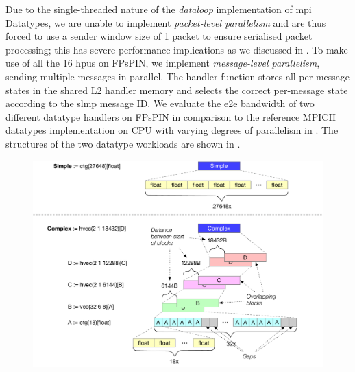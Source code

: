 Due to the single-threaded nature of the \emph{dataloop} implementation of \ac{mpi} Datatypes, we are unable to implement \emph{packet-level parallelism} and are thus forced to use a sender window size of 1 packet to ensure serialised packet processing; this has severe performance implications as we discussed in .  To make use of all the 16 \ac{hpu}s on FPsPIN, we implement \emph{message-level parallelism}, sending multiple messages in parallel.  The handler function stores all per-message states in the shared L2 handler memory and selects the correct per-message state according to the \ac{slmp} message ID.  We evaluate the \ac{e2e} bandwidth of two different datatype handlers on FPsPIN in comparison to the reference MPICH datatypes implementation on CPU with varying degrees of parallelism in .  The structures of the two datatype workloads are shown in . 

\begin{figure}[tp]
    \centering
    \includegraphics[width=.8\textwidth]{thesis/figures/datatypes-structure.pdf}
    \caption{} \label{fig:datatypes-structure}
\end{figure}

